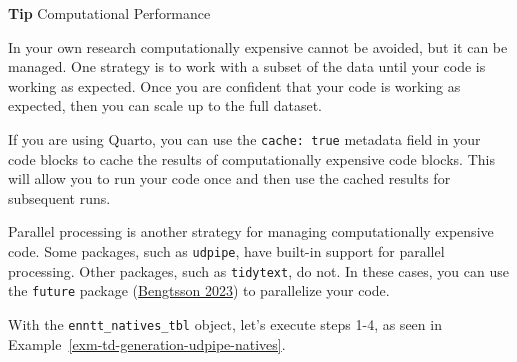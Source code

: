 \documentclass[
  letterpaper,
  DIV=11,
  numbers=noendperiod]{scrreport}
\theoremstyle{definition}
\theoremstyle{remark}
\begin{document}
\begin{tcolorbox}[enhanced jigsaw, leftrule=.75mm, bottomrule=.15mm, opacityback=0, breakable, left=2mm, colback=white, toprule=.15mm, arc=.35mm, rightrule=.15mm]

\textbf{ Tip} Computational Performance

In your own research computationally expensive cannot be avoided, but it
can be managed. One strategy is to work with a subset of the data until
your code is working as expected. Once you are confident that your code
is working as expected, then you can scale up to the full dataset.

If you are using Quarto, you can use the \texttt{cache:\ true} metadata
field in your code blocks to cache the results of computationally
expensive code blocks. This will allow you to run your code once and
then use the cached results for subsequent runs.

Parallel processing is another strategy for managing computationally
expensive code. Some packages, such as \texttt{udpipe}, have built-in
support for parallel processing. Other packages, such as
\texttt{tidytext}, do not. In these cases, you can use the
\texttt{future} package (\protect\hyperlink{ref-R-future}{Bengtsson
2023}) to parallelize your code.

\end{tcolorbox}

With the \texttt{enntt\_natives\_tbl} object, let's execute steps 1-4,
as seen in Example~\ref{exm-td-generation-udpipe-natives}.
\end{document}
